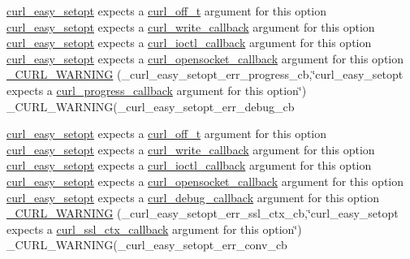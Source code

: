 \begin{DoxyCompactItemize}
\item 
\hyperlink{easy_8h_a7b171739b7bb728b3b58b2e6ec454aa0}{curl\+\_\+easy\+\_\+setopt} expects a \hyperlink{curlbuild_8h_a494e2b4279dc064f7ed1d0abd602b28d}{curl\+\_\+off\+\_\+t} argument for this option \hyperlink{easy_8h_a7b171739b7bb728b3b58b2e6ec454aa0}{curl\+\_\+easy\+\_\+setopt} expects a \hyperlink{curl_8h_ad65e62dcde45b356254b0f25f38dd802}{curl\+\_\+write\+\_\+callback} argument for this option \hyperlink{easy_8h_a7b171739b7bb728b3b58b2e6ec454aa0}{curl\+\_\+easy\+\_\+setopt} expects a \hyperlink{curl_8h_ae0524f6ec082005e39eb275c71c59a3b}{curl\+\_\+ioctl\+\_\+callback} argument for this option \hyperlink{easy_8h_a7b171739b7bb728b3b58b2e6ec454aa0}{curl\+\_\+easy\+\_\+setopt} expects a \hyperlink{curl_8h_a1b8b8f3e1a4e538a6bb1dd83a3388547}{curl\+\_\+opensocket\+\_\+callback} argument for this option \hyperlink{typecheck-gcc_8h_aef8013d9624220baa0e35e9aea995039}{\+\_\+\+C\+U\+R\+L\+\_\+\+W\+A\+R\+N\+I\+NG} (\+\_\+curl\+\_\+easy\+\_\+setopt\+\_\+err\+\_\+progress\+\_\+cb,\char`\"{}curl\+\_\+easy\+\_\+setopt expects a \hyperlink{curl_8h_af0a8c6d62890980b259658d6a4b5454a}{curl\+\_\+progress\+\_\+callback} argument for this option\char`\"{}) \+\_\+\+C\+U\+R\+L\+\_\+\+W\+A\+R\+N\+I\+NG(\+\_\+curl\+\_\+easy\+\_\+setopt\+\_\+err\+\_\+debug\+\_\+cb
\item 
\hyperlink{easy_8h_a7b171739b7bb728b3b58b2e6ec454aa0}{curl\+\_\+easy\+\_\+setopt} expects a \hyperlink{curlbuild_8h_a494e2b4279dc064f7ed1d0abd602b28d}{curl\+\_\+off\+\_\+t} argument for this option \hyperlink{easy_8h_a7b171739b7bb728b3b58b2e6ec454aa0}{curl\+\_\+easy\+\_\+setopt} expects a \hyperlink{curl_8h_ad65e62dcde45b356254b0f25f38dd802}{curl\+\_\+write\+\_\+callback} argument for this option \hyperlink{easy_8h_a7b171739b7bb728b3b58b2e6ec454aa0}{curl\+\_\+easy\+\_\+setopt} expects a \hyperlink{curl_8h_ae0524f6ec082005e39eb275c71c59a3b}{curl\+\_\+ioctl\+\_\+callback} argument for this option \hyperlink{easy_8h_a7b171739b7bb728b3b58b2e6ec454aa0}{curl\+\_\+easy\+\_\+setopt} expects a \hyperlink{curl_8h_a1b8b8f3e1a4e538a6bb1dd83a3388547}{curl\+\_\+opensocket\+\_\+callback} argument for this option \hyperlink{easy_8h_a7b171739b7bb728b3b58b2e6ec454aa0}{curl\+\_\+easy\+\_\+setopt} expects a \hyperlink{curl_8h_a50147c55283ee1fa3322b0d5aff2326c}{curl\+\_\+debug\+\_\+callback} argument for this option \hyperlink{typecheck-gcc_8h_a1edc9e69bef3da2b6c4f152a691a86fb}{\+\_\+\+C\+U\+R\+L\+\_\+\+W\+A\+R\+N\+I\+NG} (\+\_\+curl\+\_\+easy\+\_\+setopt\+\_\+err\+\_\+ssl\+\_\+ctx\+\_\+cb,\char`\"{}curl\+\_\+easy\+\_\+setopt expects a \hyperlink{curl_8h_a9b5a1cf0ff518b80be52ff24bdea5d8a}{curl\+\_\+ssl\+\_\+ctx\+\_\+callback} argument for this option\char`\"{}) \+\_\+\+C\+U\+R\+L\+\_\+\+W\+A\+R\+N\+I\+NG(\+\_\+curl\+\_\+easy\+\_\+setopt\+\_\+err\+\_\+conv\+\_\+cb

\end{DoxyCompactItemize}
